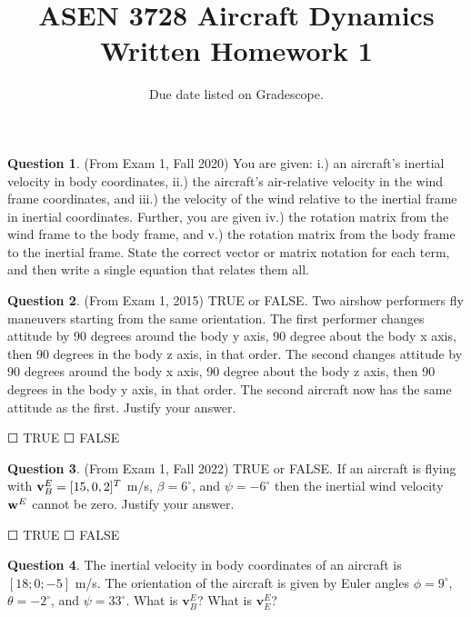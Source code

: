 \documentclass{article}
\title{ASEN 3728 Aircraft Dynamics\\Written Homework 1}
\date{Due date listed on Gradescope.}
\theoremstyle{definition}
\newtheorem{question}{Question}
\newcommand{\option}{{\Large$\Square$ }}
\begin{document}
\maketitle

\begin{question}(From Exam 1, Fall 2020)
    You are given: i.) an aircraft’s inertial velocity in body coordinates, ii.) the aircraft’s air-relative velocity in the wind frame coordinates, and iii.) the velocity of the wind relative to the inertial frame in inertial coordinates. Further, you are given iv.) the rotation matrix from the wind frame to the body frame, and v.) the rotation matrix from the body frame to the inertial frame. State the correct vector or matrix notation for each term, and then write a single equation that relates them all.
\end{question}

\vspace{6cm}

\begin{question}(From Exam 1, 2015)
    TRUE or FALSE. Two airshow performers fly maneuvers starting from the same orientation. The first performer changes attitude by 90 degrees around the body y axis, 90 degree about the body x axis, then 90 degrees in the body z axis, in that order. The second changes attitude by 90 degrees around the body x axis, 90 degree about the body z axis, then 90 degrees in the body y axis, in that order. The second aircraft now has the same attitude as the first.  Justify your answer.
\end{question}
\vspace{1ex}
\option TRUE \hspace{1cm} \option FALSE

\clearpage

\begin{question}(From Exam 1, Fall 2022)
    TRUE or FALSE. If an aircraft is flying with ${\bf v}^E_B = [15, 0, 2]^T$ m/s, $\beta = 6^{\circ}$, and $\psi = -6^{\circ}$ then the inertial wind velocity ${\bf w}^E$ cannot be zero.  Justify your answer.
\end{question}
\vspace{1ex}
\option TRUE \hspace{1cm} \option FALSE


\vspace{8cm}

\begin{question}
    The inertial velocity in body coordinates of an aircraft is $[18; 0; -5]$ m/s. The orientation of the aircraft is given by Euler angles $\phi = 9^{\circ}$, $\theta = -2^{\circ}$, and $\psi = 33^{\circ}$. What is $\mathbf{v}_B^E$? What is $\mathbf{v}_E^E$?
\end{question}
\end{document}
